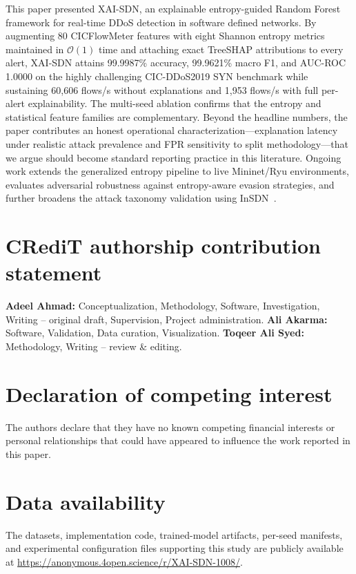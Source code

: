 \documentclass{ieeeaccess}
\begin{document}
This paper presented XAI-SDN, an explainable entropy-guided Random Forest framework for real-time DDoS detection in software defined networks. By augmenting 80 CICFlowMeter features with eight Shannon entropy metrics maintained in $\mathcal{O}(1)$ time and attaching exact TreeSHAP attributions to every alert, XAI-SDN attains 99.9987\% accuracy, 99.9621\% macro F1, and AUC-ROC 1.0000 on the highly challenging CIC-DDoS2019 SYN benchmark while sustaining 60,606 flows/s without explanations and 1,953 flows/s with full per-alert explainability. The multi-seed ablation confirms that the entropy and statistical feature families are complementary. Beyond the headline numbers, the paper contributes an honest operational characterization---explanation latency under realistic attack prevalence and FPR sensitivity to split methodology---that we argue should become standard reporting practice in this literature. Ongoing work extends the generalized entropy pipeline to live Mininet/Ryu environments, evaluates adversarial robustness against entropy-aware evasion strategies, and further broadens the attack taxonomy validation using InSDN~\cite{elsayed2020insdn}.

\section*{CRediT authorship contribution statement}
\textbf{Adeel Ahmad:} Conceptualization, Methodology, Software, Investigation, Writing -- original draft, Supervision, Project administration. \textbf{Ali Akarma:} Software, Validation, Data curation, Visualization. \textbf{Toqeer Ali Syed:} Methodology, Writing -- review \& editing.

\section*{Declaration of competing interest}
The authors declare that they have no known competing financial interests or personal relationships that could have appeared to influence the work reported in this paper.

\section*{Data availability}
The datasets, implementation code, trained-model artifacts, per-seed manifests, and experimental configuration files supporting this study are publicly available at \url{https://anonymous.4open.science/r/XAI-SDN-1008/}.











\EOD
\end{document}
